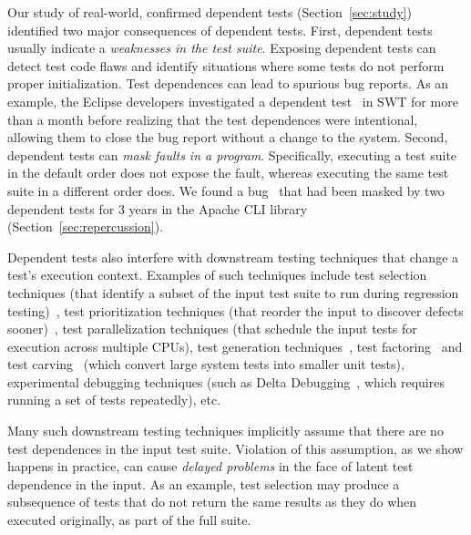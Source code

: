 Our study of \dtnum real-world, confirmed dependent
tests 
(Section~\ref{sec:study}) identified two 
major consequences of dependent tests.
%
First, dependent tests usually indicate a
\emph{weaknesses in the test suite}. Exposing
dependent tests can detect test code flaws and identify situations
where some tests do not perform proper initialization.
Test dependences can lead
to {spurious bug reports}. As an example, the Eclipse developers
investigated a dependent test~\cite{eclipsebug} in SWT for
more than a month before realizing that the test dependences were intentional,
allowing them to close the bug report without a change to the system.
%
Second, dependent tests can
\emph{mask faults in a program}. Specifically, executing a test suite in the
default order does not expose the fault, whereas
executing the same test suite in a different order does. We found 
a bug~\cite{clibug} that had been masked by two dependent tests
for 3 years in the Apache CLI library~\cite{cli} (Section~\ref{sec:repercussion}).


Dependent tests also interfere with downstream testing
techniques that change a test's execution context.
Examples of such techniques include
test selection techniques (that identify a subset of
the input test suite to run during
regression testing)~\cite{harroldetal:OOPSLA:2001},
test prioritization techniques (that reorder the
input to discover defects sooner)~\cite{Elbaum:2000:PTC:347324.348910},
test parallelization techniques (that schedule the input tests for execution across multiple
CPUs), test generation techniques~\cite{PachecoLET2007, SPLAT},
test factoring~\cite{Saff:2005} and test carving~\cite{Elbaum:2006} (which
convert large system tests into smaller unit tests),
experimental debugging techniques (such as Delta Debugging~\cite{Zeller:2002},
which requires running a set of tests repeatedly), etc. 

Many such downstream testing techniques implicitly assume that
there are no test dependences in the input test suite.  Violation of
this assumption, as we show happens in practice, can cause \emph{delayed problems} in the face
of latent test dependence in the input.  As an
example, test selection may produce a subsequence of tests that do not
return the same results as they do when executed originally, as part of the full suite.


